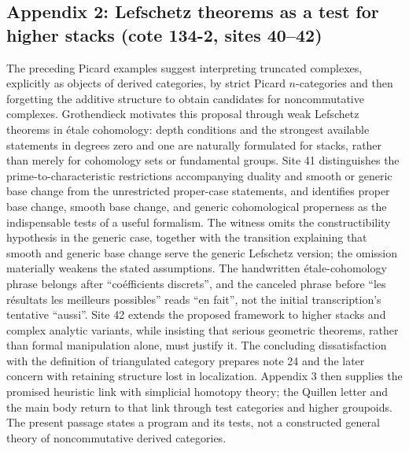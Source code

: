 \subsection*{Appendix 2: Lefschetz theorems as a test for higher stacks (cote 134-2, sites 40--42)}
The preceding Picard examples suggest interpreting truncated complexes, explicitly as objects of derived categories, by strict Picard $n$-categories and then forgetting the additive structure to obtain candidates for noncommutative complexes. Grothendieck motivates this proposal through weak Lefschetz theorems in étale cohomology: depth conditions and the strongest available statements in degrees zero and one are naturally formulated for stacks, rather than merely for cohomology sets or fundamental groups. Site 41 distinguishes the prime-to-characteristic restrictions accompanying duality and smooth or generic base change from the unrestricted proper-case statements, and identifies proper base change, smooth base change, and generic cohomological properness as the indispensable tests of a useful formalism. The witness omits the constructibility hypothesis in the generic case, together with the transition explaining that smooth and generic base change serve the generic Lefschetz version; the omission materially weakens the stated assumptions. The handwritten étale-cohomology phrase belongs after ``coéfficients discrets'', and the canceled phrase before ``les résultats les meilleurs possibles'' reads ``en fait'', not the initial transcription's tentative ``aussi''. Site 42 extends the proposed framework to higher stacks and complex analytic variants, while insisting that serious geometric theorems, rather than formal manipulation alone, must justify it. The concluding dissatisfaction with the definition of triangulated category prepares note 24 and the later concern with retaining structure lost in localization. Appendix 3 then supplies the promised heuristic link with simplicial homotopy theory; the Quillen letter and the main body return to that link through test categories and higher groupoids. The present passage states a program and its tests, not a constructed general theory of noncommutative derived categories.

